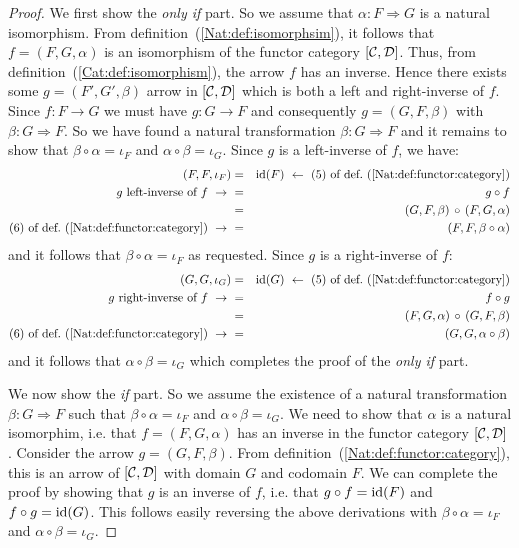 \begin{proof}
    We first show the {\em only if} part. So we assume that 
    $\alpha:F\Rightarrow G$ is a natural isomorphism. From 
    definition~(\ref{Nat:def:isomorphsim}), it follows that
    $f=(F,G,\alpha)$ is an isomorphism of the functor category
    $[\mbox{$\cal C$},\mbox{$\cal D$}]$. Thus, from definition~(\ref{Cat:def:isomorphism}), 
    the arrow $f$ has an inverse. Hence there exists some
    $g=(F',G',\beta)$ arrow in $[\mbox{$\cal C$},\mbox{$\cal D$}]$ which is both a left and
    right-inverse of $f$. Since $f:F\to G$ we must have $g:G\to F$ and
    consequently $g=(G,F,\beta)$ with $\beta:G\Rightarrow F$. So we
    have found a natural transformation $\beta:G\Rightarrow F$ and 
    it remains to show that $\beta\circ\alpha=\iota_{F}$ and 
    $\alpha\circ\beta=\iota_{G}$. Since $g$ is a left-inverse of $f$,
    we have: 
        \begin{eqnarray*}(F,F,\iota_{F})
            &=&\id(F)\ \leftarrow\ 
            \mbox{$(5)$ of def.~(\ref{Nat:def:functor:category})}\\
            \mbox{$g$ left-inverse of $f$}\ \to\ 
            &=&g\circ f\\
            &=&(G,F,\beta)\,\circ\,(F,G,\alpha)\\
            \mbox{$(6)$ of def.~(\ref{Nat:def:functor:category})}\ \to\ 
            &=&(F,F,\beta\circ\alpha)
        \end{eqnarray*}
    and it follows that $\beta\circ\alpha=\iota_{F}$ as requested. Since $g$ is
    a right-inverse of $f$:
        \begin{eqnarray*}(G,G,\iota_{G})
            &=&\id(G)\ \leftarrow\ 
            \mbox{$(5)$ of def.~(\ref{Nat:def:functor:category})}\\
            \mbox{$g$ right-inverse of $f$}\ \to\ 
            &=&f\circ g\\
            &=&(F,G,\alpha)\,\circ\,(G,F,\beta)\\
            \mbox{$(6)$ of def.~(\ref{Nat:def:functor:category})}\ \to\ 
            &=&(G,G,\alpha\circ\beta)
        \end{eqnarray*}
    and it follows that $\alpha\circ\beta=\iota_{G}$ which completes
    the proof of the {\em only if} part.
    
    We now show the {\em if} part. So we assume the existence of a 
    natural transformation $\beta:G\Rightarrow F$ such that 
    $\beta\circ\alpha=\iota_{F}$ and $\alpha\circ\beta=\iota_{G}$.
    We need to show that $\alpha$ is a natural isomorphim, i.e.
    that $f=(F,G,\alpha)$ has an inverse in the functor category
    $[\mbox{$\cal C$},\mbox{$\cal D$}]$. Consider the arrow $g=(G,F,\beta)$. From
    definition~(\ref{Nat:def:functor:category}), this is an
    arrow of $[\mbox{$\cal C$},\mbox{$\cal D$}]$ with domain $G$ and codomain $F$.
    We can complete the proof by showing that $g$ is an inverse of
    $f$, i.e. that $g\circ f=\mbox{\rm id}(F)$ and $f\circ g=\mbox{\rm id}(G)$. 
    This follows easily reversing the above derivations with
    $\beta\circ\alpha=\iota_{F}$ and $\alpha\circ\beta=\iota_{G}$.
\end{proof}

